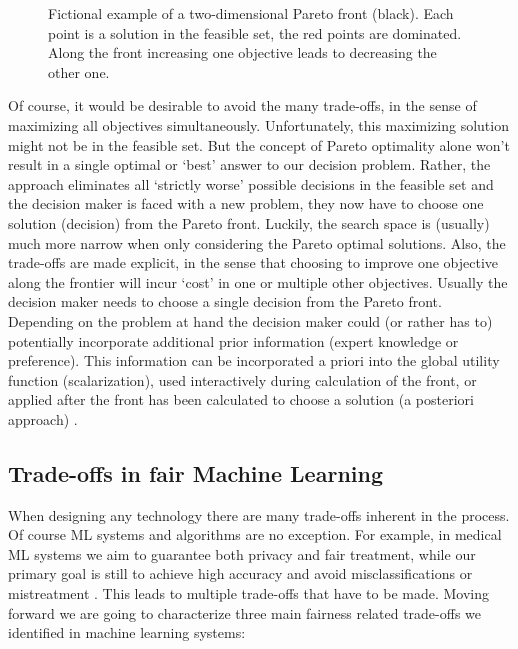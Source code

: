 	\begin{figure}
	\begin{center}
			
	\caption{Fictional example of a two-dimensional Pareto front (black). Each point is a solution in the feasible set, the red points are dominated. Along the front increasing one objective leads to decreasing the other one.}
	\label{fig:pareto}
	\end{center}
	\end{figure}
	
	Of course, it would be desirable to avoid the many trade-offs, in the sense of maximizing all objectives simultaneously.
	Unfortunately, this maximizing solution might not be in the feasible set.
	But the concept of Pareto optimality alone won't result in a single optimal or `best' answer to our decision problem.
	Rather, the approach eliminates all `strictly worse' possible decisions in the feasible set and the decision maker is faced with a new problem, they now have to choose one solution (decision) from the Pareto front.
	Luckily, the search space is (usually) much more narrow when only considering the Pareto optimal solutions.
	Also, the trade-offs are made explicit, in the sense that choosing to improve one objective along the frontier will incur `cost' in one or multiple other objectives.
	Usually the decision maker needs to choose a single decision from the Pareto front.
	Depending on the problem at hand the decision maker could (or rather has to) potentially incorporate additional prior information (expert knowledge or preference).
	This information can be incorporated a priori into the global utility function (scalarization), used interactively during calculation of the front, or applied after the front has been calculated to choose a solution (a posteriori approach) \cite{hwang2012multiple}.


	\subsection{Trade-offs in fair Machine Learning}
	\label{tradeoffs_ml}
	When designing any technology \cite{alexander1964notes} there are many trade-offs inherent in the process.
	Of course ML systems and algorithms are no exception.
	For example, in medical ML systems we aim to guarantee both privacy and fair treatment, while our primary goal is still to achieve high accuracy and avoid misclassifications or mistreatment \cite{Chester2020}.
	This leads to multiple trade-offs that have to be made.
	Moving forward we are going to characterize three main fairness related trade-offs we identified in machine learning systems:
	
